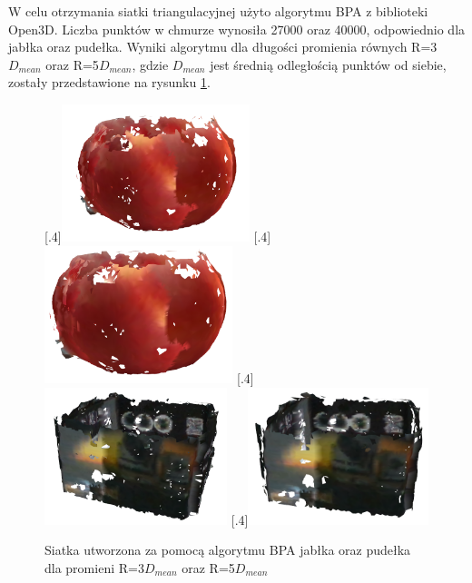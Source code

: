W celu otrzymania siatki triangulacyjnej użyto algorytmu BPA z biblioteki Open3D. Liczba punktów w chmurze wynosiła 27000 oraz 40000, odpowiednio dla jabłka oraz pudełka. Wyniki algorytmu dla długości promienia równych R=3$D_{mean}$ oraz R=5$D_{mean}$, gdzie $D_{mean}$ jest średnią odległością punktów od siebie, zostały przedstawione na rysunku \ref{fig:globalRegisterBpaAppleBox}.
\begin{figure}[H]
\centering
{}%
  [.4\linewidth]{\includegraphics[height=4cm]{bpa_apple_global_45_3dmean.PNG}}
  [.4\linewidth]{\includegraphics[height=4cm]{bpa_apple_global_45_5dmean.PNG}}
  [.4\linewidth]{\includegraphics[height=4cm]{bpa_box_global_3dmean.PNG}}
  [.4\linewidth]{\includegraphics[height=4cm]{bpa_box_global_5dmean.PNG}}
\caption{Siatka utworzona za pomocą algorytmu BPA jabłka oraz pudełka dla promieni R=3$D_{mean}$ oraz R=5$D_{mean}$}\label{fig:globalRegisterBpaAppleBox}
\end{figure} 
